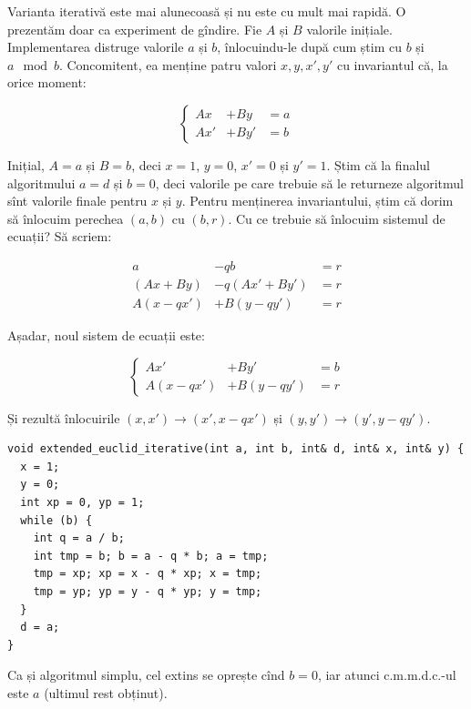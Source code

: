 \documentclass[../main.tex]{subfiles}
\begin{document}
Varianta iterativă este mai alunecoasă și nu este cu mult mai rapidă. O prezentăm doar ca experiment de gîndire. Fie $A$ și $B$ valorile inițiale. Implementarea distruge valorile $a$ și $b$, înlocuindu-le după cum știm cu $b$ și $a \mod b$. Concomitent, ea menține patru valori $x, y, x', y'$ cu invariantul că, la orice moment:

\begin{equation}
  \left\{
  \begin{aligned}
    Ax &+ By &= a\\
    Ax' &+ By' &= b
  \end{aligned}
  \right.
\end{equation}

Inițial, $A = a$ și $B = b$, deci $x = 1$, $y = 0$, $x' = 0$ și $y' = 1$. Știm că la finalul algoritmului $a = d$ și $b = 0$, deci valorile pe care trebuie să le returneze algoritmul sînt valorile finale pentru $x$ și $y$. Pentru menținerea invariantului, știm că dorim să înlocuim perechea $(a, b)$ cu $(b, r)$. Cu ce trebuie să înlocuim sistemul de ecuații? Să scriem:

$$
\begin{aligned}
  a &- qb &= r\\
  (Ax + By) &- q(Ax' + By') &= r\\
  A(x - qx') &+ B(y - qy') &= r
\end{aligned}
$$

Așadar, noul sistem de ecuații este:

\begin{equation}
  \left\{
  \begin{aligned}
    Ax' &+ By' &= b\\
    A(x - qx') &+ B(y - qy') &= r
  \end{aligned}
  \right.
\end{equation}

Și rezultă înlocuirile $(x, x') \to (x', x - qx')$ și $(y, y') \to (y', y - qy')$.

\begin{verbatim}
void extended_euclid_iterative(int a, int b, int& d, int& x, int& y) {
  x = 1;
  y = 0;
  int xp = 0, yp = 1;
  while (b) {
    int q = a / b;
    int tmp = b; b = a - q * b; a = tmp;
    tmp = xp; xp = x - q * xp; x = tmp;
    tmp = yp; yp = y - q * yp; y = tmp;
  }
  d = a;
}
\end{verbatim}

Ca și algoritmul simplu, cel extins se oprește cînd $b = 0$, iar atunci c.m.m.d.c.-ul este $a$ (ultimul rest obținut).
\end{document}

